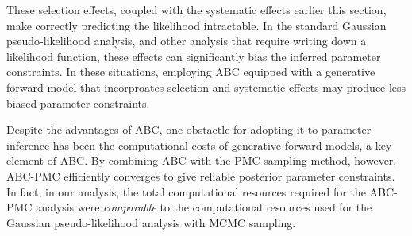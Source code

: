These selection effects, coupled with the systematic effects earlier this section, 
make correctly predicting the likelihood intractable. In the standard Gaussian 
pseudo-likelihood analysis, and other analysis that require writing down a 
likelihood function, these effects can significantly 
bias the inferred parameter constraints. In these situations, employing
ABC equipped with a generative forward model that incorproates selection and 
systematic effects may produce less biased parameter constraints. 

Despite the advantages of ABC, one obstactle for adopting it to parameter 
inference has been the computational costs of generative forward models, a 
key element of ABC. By combining ABC with the PMC sampling method, however, 
ABC-PMC efficiently converges to give reliable posterior parameter constraints. 
In fact, in our analysis, the total computational resources required for the 
ABC-PMC analysis were {\em comparable} to the computational resources used 
for the Gaussian pseudo-likelihood analysis with MCMC sampling.

